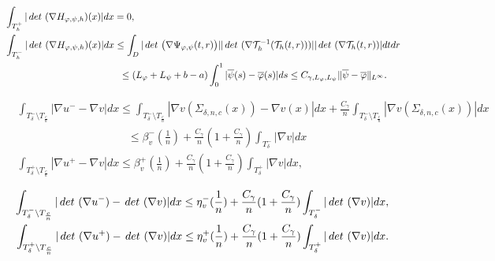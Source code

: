 \documentclass[10pt,a4paper]{amsart}
\def\det{\,{\rm det\ }}
\begin{document}
\begin{align}\label{est:detH}
&\int_{T_h^+}|\det(\nabla H_{\varphi,\psi,h})(x)|dx=0,\\
&\int_{T_h^-}|\det(\nabla H_{\varphi,\psi,h})(x)|dx\leq \int_D|\det\big(\nabla \Psi_{\varphi,\psi}(t,r)\big)||\det(\nabla \mathcal T_h^{-1}(\mathcal T_h(t,r)))||\det(\nabla \mathcal T_h(t,r))|dtdr\nonumber\\
&\qquad \qquad \qquad \qquad \qquad \qquad\leq (L_\varphi+L_\psi+b-a)\int_0^{1}|{\overline \psi}(s)-{\overline \varphi}(s)|ds\leq C_{\gamma,L_\varphi,L_\psi}\|{\overline \psi}-{\overline \varphi}\|_{L^\infty}.\nonumber
\end{align}

\begin{align}\label{grad_inTdelta}
	&\int_{T^-_\delta\setminus T_{\frac cn}}|\nabla u^--\nabla v|dx\leq  \int_{T^-_\delta\setminus T_{\frac cn}}|\nabla v(\Sigma_{\delta,n,c}(x))-\nabla v(x)|dx +\frac {C_\gamma}{n}\int_{T^-_\delta\setminus T_{\frac cn}}|\nabla v(\Sigma_{\delta,n,c}(x))|dx\nonumber\\
	&\qquad\qquad\qquad\qquad\qquad \leq  \beta^-_v(\frac1n)+\frac {C_\gamma}{n}(1+ \frac {C_\gamma}{n})\int_{T_\delta^-} |\nabla v|dx\nonumber\\
	&\int_{T^+_\delta\setminus T_{\frac cn}}|\nabla u^+-\nabla v|dx\leq \beta^+_v(\frac1n)+\frac {C_\gamma}{n}(1+ \frac {C_\gamma}{n})\int_{T_\delta^+} |\nabla v|dx,
\end{align}

\begin{align}\label{det_inTdelta}
	\int_{T^-_\delta\setminus T_{\frac cn}}|\det(\nabla u^-)-\det(\nabla v)|dx\leq \eta^-_v(\frac1n)+\frac {C_\gamma}{n}(1+ \frac {C_\gamma}{n})\int_{T_\delta^-}|\det(\nabla v)|dx,\nonumber\\
	\int_{T^+_\delta\setminus T_{\frac cn}}|\det(\nabla u^+)-\det(\nabla v)|dx\leq \eta^+_v(\frac1n)+\frac {C_\gamma}{n}(1+ \frac {C_\gamma}{n})\int_{T_\delta^+}|\det(\nabla v)|dx.
\end{align}
\end{document}
